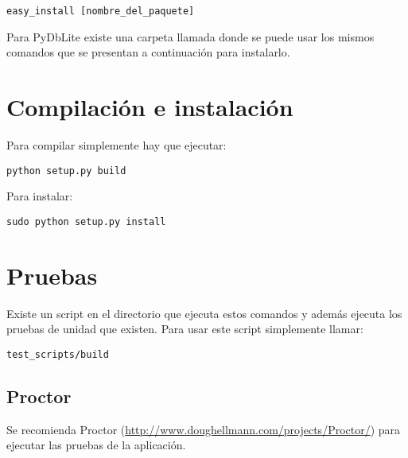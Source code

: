 \begin{verbatim}
easy_install [nombre_del_paquete]
\end{verbatim}

Para PyDbLite existe una carpeta llamada  donde se puede usar los mismos comandos que se presentan a continuación para instalarlo.

\section{Compilación e instalación}

Para compilar simplemente hay que ejecutar:

\begin{verbatim}
python setup.py build
\end{verbatim}

Para instalar:

\begin{verbatim}
sudo python setup.py install
\end{verbatim}

\section{Pruebas}

Existe un script en el directorio  que ejecuta estos comandos y además ejecuta los pruebas de unidad que existen. Para usar este script simplemente llamar:

\begin{verbatim}
test_scripts/build
\end{verbatim}

\subsection{Proctor}

Se recomienda Proctor (\url{http://www.doughellmann.com/projects/Proctor/}) para ejecutar las pruebas de la aplicación.



